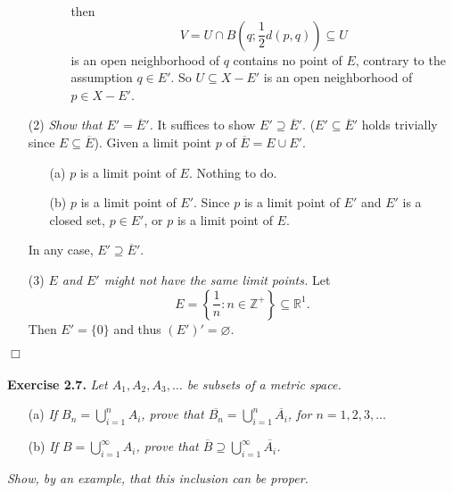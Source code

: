 \documentclass{article}
\begin{document}
\begin{enumerate}
\begin{enumerate}
\begin{enumerate}
    then
    $$V = U \cap B\left( q; \frac{1}{2}d(p,q) \right) \subseteq U$$
    is an open neighborhood of $q$ contains no point of $E$,
    contrary to the assumption $q \in E'$.
    So $U \subseteq X-E'$ is an open neighborhood of $p \in X-E'$.
    \end{enumerate}
  \end{enumerate}
\item[(2)]
\emph{Show that $E' = \overline{E}'$.}
It suffices to show $E' \supseteq \overline{E}'$.
($E' \subseteq \overline{E}'$ holds trivially since $E \subseteq \overline{E}$).
Given a limit point $p$ of $\overline{E} = E \cup E'$.
  \begin{enumerate}
  \item[(a)]
  $p$ is a limit point of $E$. Nothing to do.
  \item[(b)]
  $p$ is a limit point of $E'$.
  Since $p$ is a limit point of $E'$ and $E'$ is a closed set,
  $p \in E'$, or $p$ is a limit point of $E$.
  \end{enumerate}
In any case, $E' \supseteq \overline{E}'$.
\item[(3)]
\emph{$E$ and $E'$ might not have the same limit points.}
Let
$$E = \left\{ \frac{1}{n} : n \in \mathbb{Z}^+ \right\} \subseteq \mathbb{R}^1.$$
Then $E' = \{0\}$ and thus $(E')' = \varnothing$.
\end{enumerate}
$\Box$ \\\\






\textbf{Exercise 2.7.}
\emph{Let $A_1, A_2, A_3, \ldots$ be subsets of a metric space.}
\begin{enumerate}
\item[(a)]
\emph{If $B_n = \bigcup^{n}_{i=1} A_i$, prove that
$\overline{B_n} = \bigcup^{n}_{i=1}{\overline{A_i}}$, for $n = 1, 2, 3, \ldots$}
\item[(b)]
\emph{If $B = \bigcup^{\infty}_{i=1} A_i$,
prove that $\overline{B} \supseteq \bigcup^{\infty}_{i=1} \overline{A_i}$.}
\end{enumerate}
\emph{Show, by an example, that this inclusion can be proper. } \\
\end{document}
